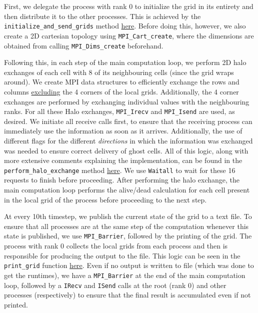 \documentclass[a4paper,10pt]{article}
\begin{document}
First, we delegate the process with rank 0 to initialize the grid in its entirety and then distribute it to the other processes. This is achieved by the \verb|initialize_and_send_grids| method \href{https://github.com/paulmyr/DD2356-MethodsHPC/blob/master/4_mpi/bonus/life_parallel.c#L34}{here}. Before doing this, however, we also create a 2D cartesian topology using \verb|MPI_Cart_create|, where the dimensions are obtained from calling \verb|MPI_Dims_create| beforehand. 

Following this, in each step of the main computation loop, we perform 2D halo exchanges of each cell with 8 of its neighbouring cells (since the grid wraps around). We create MPI data structures to efficiently exchange the rows and columns \underline{excluding} the 4 corners of the local grids. Additionally, the 4 corner exchanges are performed by exchanging individual values with the neighbouring ranks. For all these Halo exchanges, \verb|MPI_Irecv| and \verb|MPI_Isend| are used, as desired. We initiate all receive calls first, to ensure that the receiving process can immediately use the information as soon as it arrives. Additionally, the use of different flags for the different \textit{directions} in which the information was exchanged was needed to ensure correct delivery of ghost cells. All of this logic, along with more extensive comments explaining the implementation, can be found in the \verb|perform_halo_exchange| method \href{https://github.com/paulmyr/DD2356-MethodsHPC/blob/master/4_mpi/bonus/life_parallel.c#L119}{here}. We use \verb|Waitall| to wait for these 16 requests to finish before proceeding. After performing the halo exchange, the main computation loop performs the alive/dead calculation for each cell present in the local grid of the process before proceeding to the next step.

At every 10th timestep, we publish the current state of the grid to a text file. To ensure that all processes are at the same step of the computation whenever this state is published, we use \verb|MPI_Barrier|, followed by the printing of the grid. The process with rank 0 collects the local grids from each process and then is responsible for producing the output to the file. This logic can be seen in the \verb|print_grid| function \href{https://github.com/paulmyr/DD2356-MethodsHPC/blob/master/4_mpi/bonus/life_parallel.c#L192}{here}. Even if no output is written to file (which was done to get the runtimes), we have a \verb|MPI_Barrier| at the end of the main computation loop, followed by a \verb|IRecv| and \verb|ISend| calls at the root (rank 0) and other processes (respectively) to ensure that the final result is accumulated even if not printed.  
\end{document}
